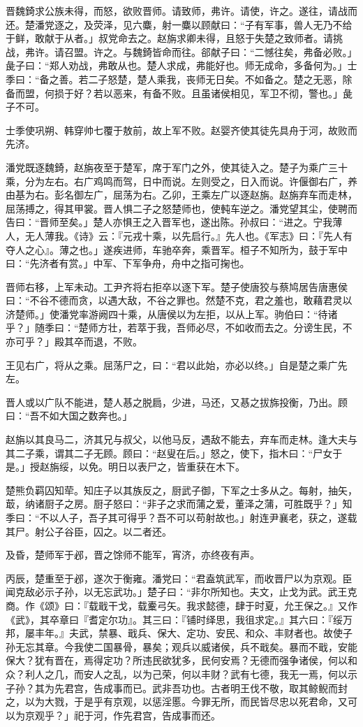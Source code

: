\documentclass[]{article}
\begin{document}
晋魏錡求公族未得，而怒，欲败晋师。请致师，弗许。请使，许之。遂往，请战而还。楚潘党逐之，及荧泽，见六麋，射一麋以顾献曰：``子有军事，兽人无乃不给于鲜，敢献于从者。」叔党命去之。赵旃求卿未得，且怒于失楚之致师者。请挑战，弗许。请召盟。许之。与魏錡皆命而往。郤献子曰：``二憾往矣，弗备必败。」彘子曰：``郑人劝战，弗敢从也。楚人求成，弗能好也。师无成命，多备何为。」士季曰：``备之善。若二子怒楚，楚人乘我，丧师无日矣。不如备之。楚之无恶，除备而盟，何损于好？若以恶来，有备不败。且虽诸侯相见，军卫不彻，警也。」彘子不可。

士季使巩朔、韩穿帅七覆于敖前，故上军不败。赵婴齐使其徒先具舟于河，故败而先济。

潘党既逐魏錡，赵旃夜至于楚军，席于军门之外，使其徒入之。楚子为乘广三十乘，分为左右。右广鸡鸣而驾，日中而说。左则受之，日入而说。许偃御右广，养由基为右。彭名御左广，屈荡为右。乙卯，王乘左广以逐赵旃。赵旃弃车而走林，屈荡搏之，得其甲裳。晋人惧二子之怒楚师也，使軘车逆之。潘党望其尘，使聘而告曰：``晋师至矣。」楚人亦惧王之入晋军也，遂出陈。孙叔曰：``进之。宁我薄人，无人薄我。《诗》云：『元戎十乘，以先启行。』先人也。《军志》曰：『先人有夺人之心』。薄之也。」遂疾进师，车驰卒奔，乘晋军。桓子不知所为，鼓于军中曰：``先济者有赏。」中军、下军争舟，舟中之指可掬也。

晋师右移，上军未动。工尹齐将右拒卒以逐下军。楚子使唐狡与蔡鸠居告唐惠侯曰：``不谷不德而贪，以遇大敌，不谷之罪也。然楚不克，君之羞也，敢藉君灵以济楚师。」使潘党率游阙四十乘，从唐侯以为左拒，以从上军。驹伯曰：``待诸乎？」随季曰：``楚师方壮，若萃于我，吾师必尽，不如收而去之。分谤生民，不亦可乎？」殿其卒而退，不败。

王见右广，将从之乘。屈荡尸之，曰：``君以此始，亦必以终。」自是楚之乘广先左。

晋人或以广队不能进，楚人惎之脱扃，少进，马还，又惎之拔旆投衡，乃出。顾曰：``吾不如大国之数奔也。」

赵旃以其良马二，济其兄与叔父，以他马反，遇敌不能去，弃车而走林。逢大夫与其二子乘，谓其二子无顾。顾曰：``赵叟在后。」怒之，使下，指木曰：``尸女于是。」授赵旃绥，以免。明日以表尸之，皆重获在木下。

楚熊负羁囚知荦。知庄子以其族反之，厨武子御，下军之士多从之。每射，抽矢，菆，纳诸厨子之房。厨子怒曰：``非子之求而蒲之爱，董泽之蒲，可胜既乎？」知季曰：``不以人子，吾子其可得乎？吾不可以苟射故也。」射连尹襄老，获之，遂载其尸。射公子谷臣，囚之。以二者还。

及昏，楚师军于邲，晋之馀师不能军，宵济，亦终夜有声。

丙辰，楚重至于邲，遂次于衡雍。潘党曰：``君盍筑武军，而收晋尸以为京观。臣闻克敌必示子孙，以无忘武功。」楚子曰：``非尔所知也。夫文，止戈为武。武王克商。作《颂》曰：『载戢干戈，载櫜弓矢。我求懿德，肆于时夏，允王保之。』又作《武》，其卒章曰『耆定尔功』。其三曰：『铺时绎思，我徂求定。』其六曰：『绥万邦，屡丰年。』夫武，禁暴、戢兵、保大、定功、安民、和众、丰财者也。故使子孙无忘其章。今我使二国暴骨，暴矣；观兵以威诸侯，兵不戢矣。暴而不戢，安能保大？犹有晋在，焉得定功？所违民欲犹多，民何安焉？无德而强争诸侯，何以和众？利人之几，而安人之乱，以为己荣，何以丰财？武有七德，我无一焉，何以示子孙？其为先君宫，告成事而已。武非吾功也。古者明王伐不敬，取其鲸鲵而封之，以为大戮，于是乎有京观，以惩淫慝。今罪无所，而民皆尽忠以死君命，又可以为京观乎？」祀于河，作先君宫，告成事而还。
\end{document}

